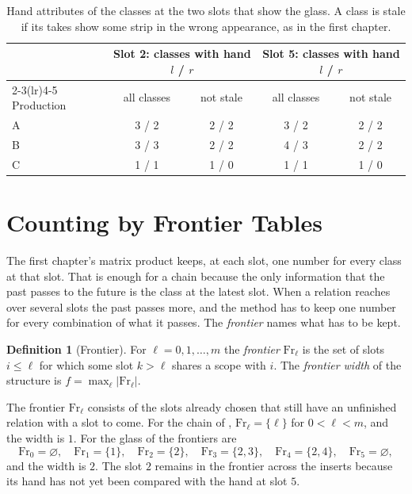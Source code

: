 \documentclass[11pt,twoside,openright]{book}
\theoremstyle{plain}
\theoremstyle{definition}
\newtheorem{definition}[theorem]{Definition}
\theoremstyle{remark}
\newcommand{\Fr}{\mathrm{Fr}}
\begin{document}
\begin{table}[ht]
\centering
\begin{tabular}{@{}lcccc@{}}
\toprule
 & \multicolumn{2}{c}{Slot 2: classes with hand $l$ / $r$} & \multicolumn{2}{c}{Slot 5: classes with hand $l$ / $r$}\\
\cmidrule(lr){2-3}\cmidrule(lr){4-5}
Production & all classes & not stale & all classes & not stale\\
\midrule
A & 3 / 2 & 2 / 2 & 3 / 2 & 2 / 2\\
B & 3 / 3 & 2 / 2 & 4 / 3 & 2 / 2\\
C & 1 / 1 & 1 / 0 & 1 / 1 & 1 / 0\\
\bottomrule
\end{tabular}
\caption{Hand attributes of the classes at the two slots that show the glass. A class is stale if its takes show some strip in the wrong appearance, as in the first chapter.}\label{tab:hands}
\end{table}

\section{Counting by Frontier Tables}\label{sec:frontier}

The first chapter's matrix product keeps, at each slot, one number for every class at that slot. That is enough for a chain because the only information that the past passes to the future is the class at the latest slot. When a relation reaches over several slots the past passes more, and the method has to keep one number for every combination of what it passes. The \emph{frontier} names what has to be kept.

\begin{definition}[Frontier]\label{def:frontier}
For $\ell=0,1,\dots,m$ the \emph{frontier} $\Fr_\ell$ is the set of slots $i\le\ell$ for which some slot $k>\ell$ shares a scope with $i$. The \emph{frontier width} of the structure is $f=\max_\ell\lvert\Fr_\ell\rvert$.
\end{definition}

The frontier $\Fr_\ell$ consists of the slots already chosen that still have an unfinished relation with a slot to come. For the chain of , $\Fr_\ell=\{\ell\}$ for $0<\ell<m$, and the width is $1$. For the glass of  the frontiers are
\[
\Fr_0=\varnothing,\quad \Fr_1=\{1\},\quad \Fr_2=\{2\},\quad \Fr_3=\{2,3\},\quad \Fr_4=\{2,4\},\quad \Fr_5=\varnothing,
\]
and the width is $2$. The slot $2$ remains in the frontier across the inserts because its hand has not yet been compared with the hand at slot $5$.
\end{document}
